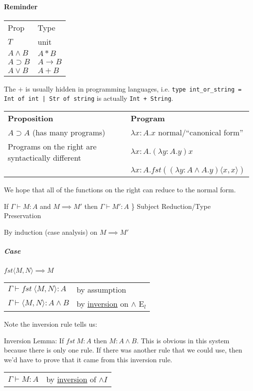 \documentclass[12 pt]{article}
\begin{document}
	\paragraph{Reminder}
	\begin{tabular}{l l}
		Prop & Type
		\\ $T$ & unit
		\\ $A \land B$ & $A * B$
		\\ $A \supset B$ & $A \rightarrow B$
		\\ $ A \lor B$ & $A + B$
	\end{tabular}
	The $+$ is usually hidden in programming languages,
	i.e. \texttt{type int\_or\_string = Int of int | Str of string}
	is actually \texttt{Int + String}.
	\begin{center}
		\begin{tabular}{l l}
			\textbf{Proposition} & \textbf{Program}
			\\ $A \supset A$ (has many programs) & $\lambda x:A.x$ \hspace{10 pt}normal/``canonical form''
			\\ Programs on the right are syntactically different & $\lambda x : A . (\lambda y: A . y) x$
			\\ & $\lambda x : A . fst ((\lambda y:A \land A . y) \langle x,x \rangle)$
		\end{tabular}
	\end{center}
	We hope that all of the functions on the right can reduce to the
	normal form.

	If $\Gamma \vdash M : A$ and $M \implies M'$ then $\Gamma \vdash
M' : A$ \} Subject Reduction/Type Preservation

	By induction (case analysis) on $M \implies M'$
	\subparagraph{Case} $fst \langle M,N \rangle \implies M$
	\\\begin{tabular}{l l}
		$\Gamma \vdash fst\ \langle M,N \rangle : A$ & by assumption
		\\ $\Gamma \vdash \langle M,N \rangle : A \land B$ & by \underline{inversion} on
		$\land$ E$_l$
	\end{tabular}

	Note the inversion rule tells us:
	\begin{prooftree}
	\end{prooftree}
	Inversion Lemma: If $fst\ M : A$ then $M:A \land B$. This is
	obvious in this system because there is only one rule. If there
	was another rule that we could use, then we'd have to prove that
	it came from this inversion rule.
	\\\begin{tabular}{l l}
		$\Gamma \vdash M : A$ & by \underline{inversion} of $\land I$
	\end{tabular}
\end{document}
